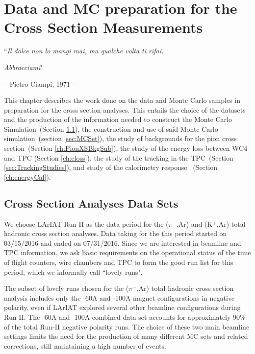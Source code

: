 \chapter{Data and MC preparation for the Cross Section Measurements}\label{ch:samples}
{\raggedleft ``\emph{Il dolce non lo mangi mai, ma qualche volta ti rifai.} \par}
{\raggedleft \emph{Abbracciami}"\par}
{\raggedleft -- Pietro Ciampi,  1971 -- \par}%
\vspace{0.5cm}



This chapter describes the  work done on the  data and Monte Carlo samples in preparation for the cross section analyses. 
This entails the choice of the datasets and the production of the information needed to construct the Monte Carlo Simulation~(Section  \ref{sec:dataSet}),  the construction and use of said Monte Carlo simulation~(section \ref{sec:MCSet}), the study of backgrounds for the pion cross section~(Section  \ref{ch:PionXSBkgSub}), the study of the energy loss between WC4 and TPC (Section \ref{ch:eloss}), the study of the tracking in the TPC~(Section  \ref{sec:TrackingStudies}), and study of  the calorimetry response ~(Section  \ref{ch:energyCal}). 


\section{Cross Section Analyses Data Sets}\label{sec:dataSet}
We choose LArIAT Run-II as the data period for the  ($\pi^{-}$,Ar) and (K$^{+}$,Ar) total hadronic cross section analyses. 
Data taking for the this period started on 03/15/2016  and ended on 07/31/2016. 
Since we are interested in beamline and TPC information, we ask basic requirements on the operational status of the time of flight counters, wire chambers and TPC to form the good run list for this period, which we informally call ``lovely runs".

The subset of lovely runs  chosen for the  ($\pi^{-}$,Ar) total hadronic cross section analysis includes only the -60A and -100A magnet configurations in negative polarity, even if LArIAT explored several other beamline configurations during Run-II. The -60A and -100A combined data set accounts for approximately 90\% of the total Run-II negative polarity runs.   The  choice of these two main beamline settings limits the need for the production of many different MC sets and related corrections, still maintaining a high number of events. 


